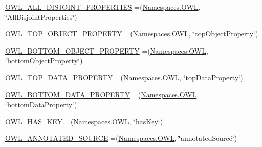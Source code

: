 \begin{DoxyCompactItemize}
\item 
\hyperlink{enumorg_1_1semanticweb_1_1owlapi_1_1vocab_1_1_o_w_l_r_d_f_vocabulary_ae456dc757dc911cbb741e9a80aea754e}{O\-W\-L\-\_\-\-A\-L\-L\-\_\-\-D\-I\-S\-J\-O\-I\-N\-T\-\_\-\-P\-R\-O\-P\-E\-R\-T\-I\-E\-S} =(\hyperlink{enumorg_1_1semanticweb_1_1owlapi_1_1vocab_1_1_namespaces_a2fcb537074d9307ef1356ffb6a5bd6f4}{Namespaces.\-O\-W\-L}, \char`\"{}All\-Disjoint\-Properties\char`\"{})
\item 
\hyperlink{enumorg_1_1semanticweb_1_1owlapi_1_1vocab_1_1_o_w_l_r_d_f_vocabulary_a7eb3bcee3e8a8913ce1efe6a3b388a0c}{O\-W\-L\-\_\-\-T\-O\-P\-\_\-\-O\-B\-J\-E\-C\-T\-\_\-\-P\-R\-O\-P\-E\-R\-T\-Y} =(\hyperlink{enumorg_1_1semanticweb_1_1owlapi_1_1vocab_1_1_namespaces_a2fcb537074d9307ef1356ffb6a5bd6f4}{Namespaces.\-O\-W\-L}, \char`\"{}top\-Object\-Property\char`\"{})
\item 
\hyperlink{enumorg_1_1semanticweb_1_1owlapi_1_1vocab_1_1_o_w_l_r_d_f_vocabulary_aabf9708ad419b056c833d166b023807b}{O\-W\-L\-\_\-\-B\-O\-T\-T\-O\-M\-\_\-\-O\-B\-J\-E\-C\-T\-\_\-\-P\-R\-O\-P\-E\-R\-T\-Y} =(\hyperlink{enumorg_1_1semanticweb_1_1owlapi_1_1vocab_1_1_namespaces_a2fcb537074d9307ef1356ffb6a5bd6f4}{Namespaces.\-O\-W\-L}, \char`\"{}bottom\-Object\-Property\char`\"{})
\item 
\hyperlink{enumorg_1_1semanticweb_1_1owlapi_1_1vocab_1_1_o_w_l_r_d_f_vocabulary_aec5fec0d4506f8c99615abfd7a4bef15}{O\-W\-L\-\_\-\-T\-O\-P\-\_\-\-D\-A\-T\-A\-\_\-\-P\-R\-O\-P\-E\-R\-T\-Y} =(\hyperlink{enumorg_1_1semanticweb_1_1owlapi_1_1vocab_1_1_namespaces_a2fcb537074d9307ef1356ffb6a5bd6f4}{Namespaces.\-O\-W\-L}, \char`\"{}top\-Data\-Property\char`\"{})
\item 
\hyperlink{enumorg_1_1semanticweb_1_1owlapi_1_1vocab_1_1_o_w_l_r_d_f_vocabulary_a3e54024fd46d749009b101462f741508}{O\-W\-L\-\_\-\-B\-O\-T\-T\-O\-M\-\_\-\-D\-A\-T\-A\-\_\-\-P\-R\-O\-P\-E\-R\-T\-Y} =(\hyperlink{enumorg_1_1semanticweb_1_1owlapi_1_1vocab_1_1_namespaces_a2fcb537074d9307ef1356ffb6a5bd6f4}{Namespaces.\-O\-W\-L}, \char`\"{}bottom\-Data\-Property\char`\"{})
\item 
\hyperlink{enumorg_1_1semanticweb_1_1owlapi_1_1vocab_1_1_o_w_l_r_d_f_vocabulary_a13ea21285f82052229495a84207c906f}{O\-W\-L\-\_\-\-H\-A\-S\-\_\-\-K\-E\-Y} =(\hyperlink{enumorg_1_1semanticweb_1_1owlapi_1_1vocab_1_1_namespaces_a2fcb537074d9307ef1356ffb6a5bd6f4}{Namespaces.\-O\-W\-L}, \char`\"{}has\-Key\char`\"{})
\item 
\hyperlink{enumorg_1_1semanticweb_1_1owlapi_1_1vocab_1_1_o_w_l_r_d_f_vocabulary_a96639cf6fd625d4339d8c33d10c00174}{O\-W\-L\-\_\-\-A\-N\-N\-O\-T\-A\-T\-E\-D\-\_\-\-S\-O\-U\-R\-C\-E} =(\hyperlink{enumorg_1_1semanticweb_1_1owlapi_1_1vocab_1_1_namespaces_a2fcb537074d9307ef1356ffb6a5bd6f4}{Namespaces.\-O\-W\-L}, \char`\"{}annotated\-Source\char`\"{})

\end{DoxyCompactItemize}
